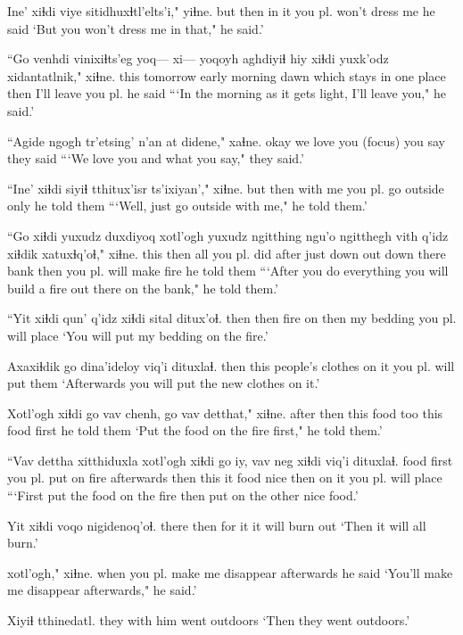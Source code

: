 \documentclass[12pt]{article}
\begin{document}
\gll Ine' xiɬdi viye sitidhuxɬtl'elts'i," yiɬne.
but then {in it} {you pl. won't dress me} {he said}
\glt `But you won't dress me in that," he said.'
\glend

\gll ``Go venhdi vinixiɬts'eg yoq--- xi--- yoqoyh {aghdiyiɬ hiy} xiɬdi {yuxk'odz xidantatlnik,"} xiɬne.
this tomorrow {early morning} {} {} dawn {which stays in one place}  then {I'll leave you pl.} {he said}
\glt ```In the morning as it gets light, I'll leave you," he said.'
\glend

\gll ``Agide {ngogh tr'etsing'} {n'an at} didene," xaɬne.
okay {we love you} {(focus)} {you say} {they said}
\glt ```We love you and what you say," they said.'
\glend

\gll ``Ine' xiɬdi siyiɬ tthitux'isr ts'ixiyan'," xiɬne.
but then {with me} {you pl. go outside} only {he told them}
\glt ```Well, just go outside with me," he told them.'
\glend

\gll ``Go xiɬdi yuxudz duxdiyoq xotl'ogh yuxudz ngitthing ngu'o ngitthegh {vith q'idz} xiɬdik xatuxɬq'oɬ," xiɬne.
this then all {you pl. did} after just down out {down there} bank then {you pl. will make fire} {he told them}
\glt ```After you do everything you will build a fire out there on the bank," he told them.'
\glend

\gll ``Yit xiɬdi qun' q'idz xiɬdi sital ditux'oɬ.
then then fire on then {my bedding} {you pl. will place}
\glt `You will put my bedding on the fire.'
\glend

\gll Axaxiɬdik go dina'ideloy viq'i dituxlaɬ.
then this {people's clothes} {on it} {you pl. will put them}
\glt `Afterwards you will put the new clothes on it.'
\glend

\gll Xotl'ogh xiɬdi go vav chenh, go vav detthat," xiɬne.
after then this food too this food first {he told them}
\glt `Put the food on the fire first," he told them.'
\glend

\gll ``Vav dettha xitthiduxla xotl'ogh xiɬdi go iy, vav neg xiɬdi viq'i dituxlaɬ.
food first {you pl. put on fire} afterwards then this it food nice then {on it} {you pl. will place}
\glt ```First put the food on the fire then put on the other nice food.'
\glend

\gll Yit xiɬdi voqo nigidenoq'oɬ.
there then {for it} {it will burn out}
\glt `Then it will all burn.'
\glend

 xotl'ogh," xiɬne.
{when you pl. make me disappear} afterwards {he said}
\glt `You'll make me disappear afterwards," he said.'
\glend

\gll Xiyiɬ tthinedatl.
{they with him} {went outdoors}
\glt `Then they went outdoors.'
\glend
\end{document}
